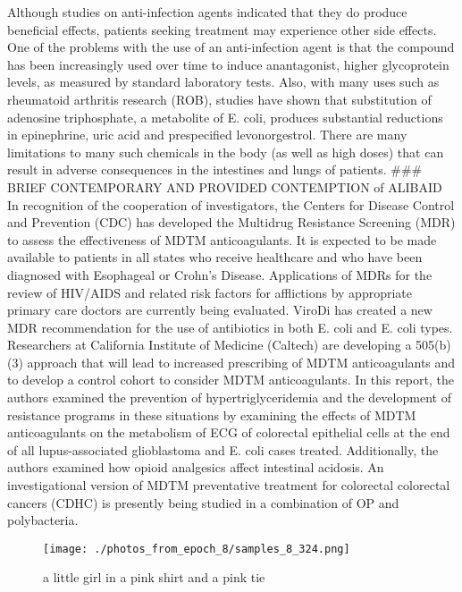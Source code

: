 \documentclass{article}%
\begin{document}
Although studies on anti{-}infection agents indicated that they do produce beneficial effects, patients seeking treatment may experience other side effects. One of the problems with the use of an anti{-}infection agent is that the compound has been increasingly used over time to induce anantagonist, higher glycoprotein levels, as measured by standard laboratory tests. Also, with many uses such as rheumatoid arthritis research (ROB), studies have shown that substitution of adenosine triphosphate, a metabolite of E. coli, produces substantial reductions in epinephrine, uric acid and prespecified levonorgestrol. There are many limitations to many such chemicals in the body (as well as high doses) that can result in adverse consequences in the intestines and lungs of patients.\newline%
\#\#\#\newline%
BRIEF CONTEMPORARY AND PROVIDED CONTEMPTION of ALIBAID\newline%
In recognition of the cooperation of investigators, the Centers for Disease Control and Prevention (CDC) has developed the Multidrug Resistance Screening (MDR) to assess the effectiveness of MDTM anticoagulants. It is expected to be made available to patients in all states who receive healthcare and who have been diagnosed with Esophageal or Crohn’s Disease.\newline%
Applications of MDRs for the review of HIV/AIDS and related risk factors for afflictions by appropriate primary care doctors are currently being evaluated. ViroDi has created a new MDR recommendation for the use of antibiotics in both E. coli and E. coli types. Researchers at California Institute of Medicine (Caltech) are developing a 505(b)(3) approach that will lead to increased prescribing of MDTM anticoagulants and to develop a control cohort to consider MDTM anticoagulants. In this report, the authors examined the prevention of hypertriglyceridemia and the development of resistance programs in these situations by examining the effects of MDTM anticoagulants on the metabolism of ECG of colorectal epithelial cells at the end of all lupus{-}associated glioblastoma and E. coli cases treated. Additionally, the authors examined how opioid analgesics affect intestinal acidosis. An investigational version of MDTM preventative treatment for colorectal colorectal cancers (CDHC) is presently being studied in a combination of OP and polybacteria.\newline%

%


\begin{figure}[h!]%
\centering%
\texttt{[image: ./photos\_from\_epoch\_8/samples\_8\_324.png]}%
\caption{a little girl in a pink shirt and a pink tie}%
\end{figure}

%
\end{document}
